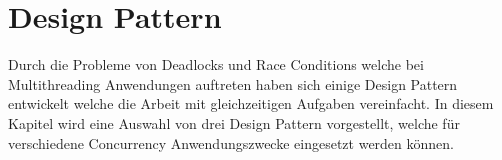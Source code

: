 \section{Design Pattern}

Durch die Probleme von Deadlocks und Race Conditions welche bei Multithreading Anwendungen auftreten haben sich einige Design Pattern entwickelt welche die Arbeit mit gleichzeitigen Aufgaben vereinfacht. In diesem Kapitel wird eine Auswahl von drei Design Pattern vorgestellt, welche für verschiedene Concurrency Anwendungszwecke eingesetzt werden können.


